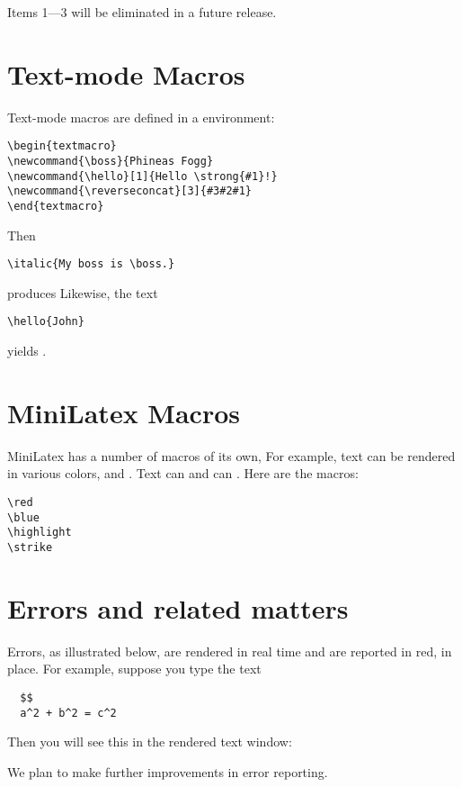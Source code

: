 Items 1—3 will be eliminated in a
future release.

\section{Text-mode Macros}

Text-mode macros are defined in a  environment:

\begin{verbatim}
\begin{textmacro}
\newcommand{\boss}{Phineas Fogg}
\newcommand{\hello}[1]{Hello \strong{#1}!}
\newcommand{\reverseconcat}[3]{#3#2#1}
\end{textmacro}
\end{verbatim}

Then

\begin{verbatim}
\italic{My boss is \boss.}
\end{verbatim}

produces 
Likewise, the text

\begin{verbatim}
\hello{John}
\end{verbatim}

yields .

\section{MiniLatex Macros}

MiniLatex has a number of macros of its own,  For
example, text can be rendered in various colors, 
and . Text can 
and can . Here are the macros:

\begin{verbatim}
\red
\blue
\highlight
\strike
\end{verbatim}

\section{Errors and related matters}

Errors, as illustrated below, are rendered in real time and are reported in red, in place.
For example, suppose you type the  text

\begin{verbatim}
  $$
  a^2 + b^2 = c^2
\end{verbatim}

Then you will see this in the rendered text window:


We plan to make further improvements in error reporting.
